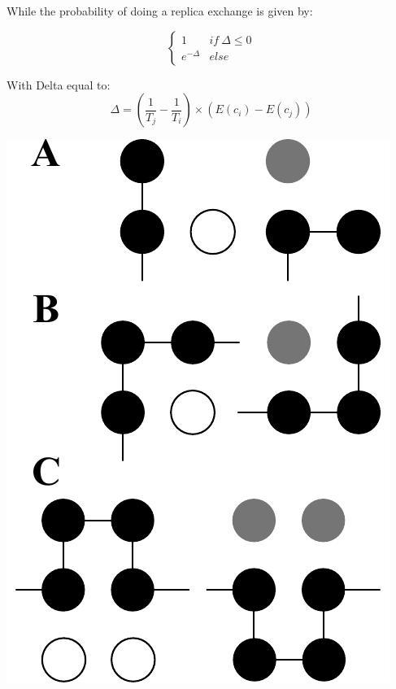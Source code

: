 \documentclass[12pt, oneside, a4paper]{report}
\begin{document}
\begin{multicols}{2}
While the probability of doing a replica exchange is given by:

\vspace{-2ex}

\begin{equation*}
    \left\lbrace
    \begin{array}{ll}
        1              & if\:\Delta{} \leq 0 \\
        e^{-\Delta}    & else
    \end{array}
    \right.
\end{equation*}

With Delta equal to:
\begin{equation*}
    \Delta = \left(\dfrac{1}{T_j} - \dfrac{1}{T_i}\right) \times \left(E\left(c_i\right) - E\left(c_j\right)\right)
\end{equation*}

\begin{minipage}{\columnwidth}
    \includegraphics[width=\textwidth]{figure/move_set.pdf}
    

\end{minipage}
\end{multicols}
\end{document}
